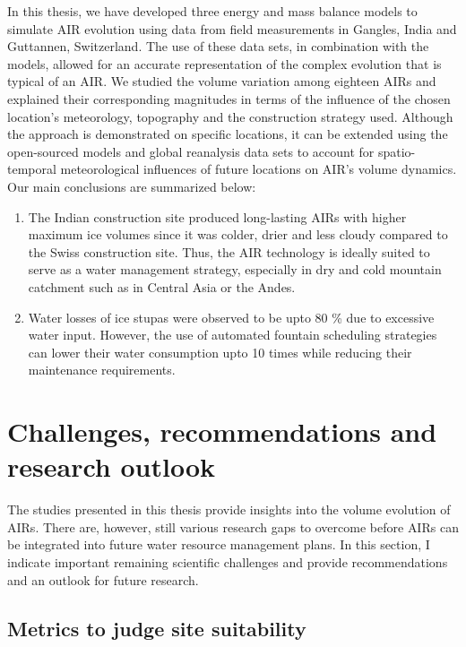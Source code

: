 In this thesis, we have developed three energy and mass balance models to simulate AIR evolution using data from
field measurements in Gangles, India and Guttannen, Switzerland. The use of these data sets, in combination with
the models, allowed for an accurate representation of the complex evolution that is typical of an AIR. We
studied the volume variation among eighteen AIRs and explained their corresponding magnitudes in terms of the
influence of the chosen location's meteorology, topography and the construction strategy used. Although the
approach is demonstrated on specific locations, it can be extended using the open-sourced models and global
reanalysis data sets to account for spatio-temporal meteorological influences of future locations on AIR's
volume dynamics. Our main conclusions are summarized below:

\begin{enumerate}

  \item The Indian construction site produced long-lasting AIRs with higher maximum ice volumes since it was
    colder, drier and less cloudy compared to the Swiss construction site. Thus, the AIR technology is ideally
    suited to serve as a water management strategy, especially in dry and cold mountain catchment such as in
    Central Asia or the Andes.

  \item Water losses of ice stupas were observed to be upto 80 \% due to excessive water input. However, the use
    of automated fountain scheduling strategies can lower their water consumption upto 10 times while reducing
    their maintenance requirements.

\end{enumerate}



\section{Challenges, recommendations and research outlook}

The studies presented in this thesis provide insights into the volume evolution of \ac{AIRs}. There are,
however, still various research gaps to overcome before \ac{AIRs} can be integrated into future water resource
management plans. In this section, I indicate important remaining scientific challenges and provide
recommendations and an outlook for future research.

\subsection{Metrics to judge site suitability}

